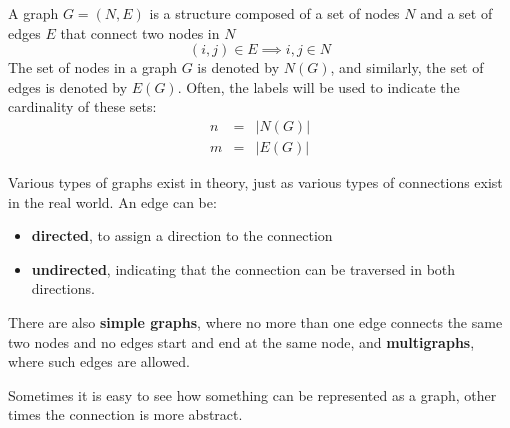 \begin{definition}[Grafo]
    A graph $G = (N,E)$ is a structure composed of a set of nodes $N$
    and a set of edges $E$ that connect two nodes in  $N$
    \[(i,j) \in E \implies i,j\in N\]
    The set of nodes in a graph $G$ is denoted by $N(G)$, and similarly, the set of edges is denoted by $E(G)$. Often, the labels will be used to indicate the cardinality of these sets:
        \[\begin{array}{rcl}
            n &=& |N(G)|\\
            m &=& |E(G)| 
        \end{array}\]    
\end{definition}Various types of graphs exist in theory, just as various types of connections exist in the real world.
An edge can be:
\begin{itemize} 
    \item \textbf{directed}, to assign a direction to the connection
    \item \textbf{undirected}, indicating that the connection can be traversed in both directions.
\end{itemize} 

There are also \textbf{simple graphs}, where no more than one edge connects the same two nodes and no edges start and end at the same node, and \textbf{multigraphs}, where such edges are allowed.

Sometimes it is easy to see how something can be represented as a graph, other times the connection is more abstract.


